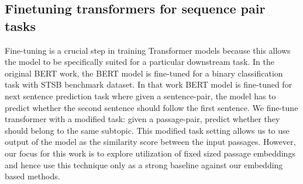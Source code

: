 \subsection{Finetuning transformers for sequence pair tasks} Fine-tuning is a crucial step in training Transformer models because this allows the model to be specifically suited for a particular downstream task. In the original BERT work, the BERT model is fine-tuned for a binary classification task with STSB benchmark dataset. In that work BERT model is fine-tuned for next sentence prediction task where given a sentence-pair, the model has to predict whether the second sentence should follow the first sentence. We fine-tune transformer with a modified task: given a passage-pair, predict whether they should belong to the same subtopic. This modified task setting allows us to use output of the model as the similarity score between the input passages. However, our focus for this work is to explore utilization of fixed sized passage embeddings and hence use this technique only as a strong baseline against our embedding based methods.